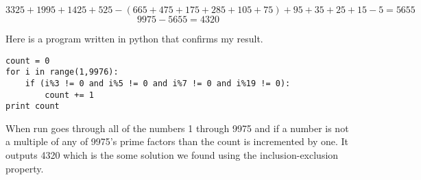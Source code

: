 \documentclass[11pt,openany]{book}
\begin{document}
\[3325+1995+1425+525 - (665+475+175+285+105+75) +95+35+25+15-5 = 5655\]
\[9975 - 5655 = 4320 \]

Here is a program written in python that confirms my result.
\begin{lstlisting}
count = 0
for i in range(1,9976):
    if (i%3 != 0 and i%5 != 0 and i%7 != 0 and i%19 != 0):
        count += 1
print count
\end{lstlisting}
When run goes through all of the numbers 1 through 9975 and if a number is not a multiple of any of 9975's prime factors than the count is incremented by one. It outputs 4320 which is the some solution we found using the inclusion-exclusion property.
\end{document}
